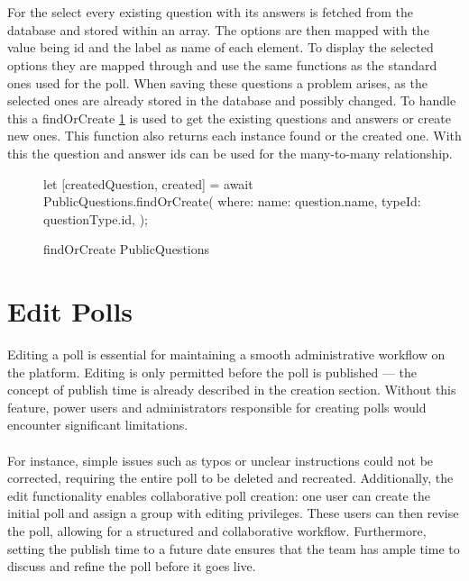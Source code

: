 \documentclass[a4paper,12pt]{report}
\begin{document}
\\ \\
For the select every existing question with its answers is fetched from the database and stored within an array. The options are then mapped with the value being id and the label as name of each element. To display the selected options they are mapped through and use the same functions as the standard ones used for the poll. When saving these questions a problem arises, as the selected ones are already stored in the database and possibly changed. To handle this a findOrCreate \ref{fig:publicQuestions} is used to get the existing questions and answers or create new ones. This function also returns each instance found or the created one. With this the question and answer ids can be used for the many-to-many relationship. \parencite{sequelizedoku} 
\begin{figure}[h!]
\begin{code}
let [createdQuestion, created] = await PublicQuestions.findOrCreate({
	where: {
		name: question.name,
		typeId: questionType.id,
	}
});
\end{code}
	\caption{findOrCreate PublicQuestions}
	\label{fig:publicQuestions}
\end{figure}

\section{Edit Polls}
Editing a poll is essential for maintaining a smooth administrative workflow on the platform. Editing is only permitted before the poll is published — the concept of publish time is already described in the creation section. Without this feature, power users and administrators responsible for creating polls would encounter significant limitations. \\ \\
For instance, simple issues such as typos or unclear instructions could not be corrected, requiring the entire poll to be deleted and recreated. Additionally, the edit functionality enables collaborative poll creation: one user can create the initial poll and assign a group with editing privileges. These users can then revise the poll, allowing for a structured and collaborative workflow. Furthermore, setting the publish time to a future date ensures that the team has ample time to discuss and refine the poll before it goes live.
\end{document}
